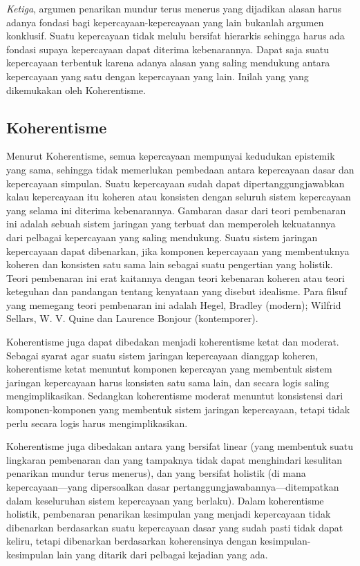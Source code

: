\documentclass[11pt,twoside,a5paper,openany]{memoir}
\begin{document}
\emph{Ketiga}, argumen penarikan mundur terus menerus yang dijadikan
alasan harus adanya fondasi bagi kepercayaan-kepercayaan yang lain
bukanlah argumen konklusif. Suatu kepercayaan tidak melulu bersifat
hierarkis sehingga harus ada fondasi supaya kepercayaan dapat diterima
kebenarannya. Dapat saja suatu kepercayaan terbentuk karena adanya
alasan yang saling mendukung antara kepercayaan yang satu dengan
kepercayaan yang lain. Inilah yang yang dikemukakan oleh Koherentisme.

\hypertarget{koherentisme}{%
\subsection{Koherentisme}\label{koherentisme}}

Menurut Koherentisme, semua kepercayaan mempunyai kedudukan epistemik
yang sama, sehingga tidak memerlukan pembedaan antara kepercayaan dasar
dan kepercayaan simpulan. Suatu kepercayaan sudah dapat
dipertanggungjawabkan kalau kepercayaan itu koheren atau konsisten
dengan seluruh sistem kepercayaan yang selama ini diterima kebenarannya.
Gambaran dasar dari teori pembenaran ini adalah sebuah sistem jaringan
yang terbuat dan memperoleh kekuatannya dari pelbagai kepercayaan yang
saling mendukung. Suatu sistem jaringan kepercayaan dapat dibenarkan,
jika komponen kepercayaan yang membentuknya koheren dan konsisten satu
sama lain sebagai suatu pengertian yang holistik. Teori pembenaran ini
erat kaitannya dengan teori kebenaran koheren atau teori keteguhan dan
pandangan tentang kenyataan yang disebut idealisme. Para filsuf yang
memegang teori pembenaran ini adalah Hegel, Bradley (modern); Wilfrid
Sellars, W. V. Quine dan Laurence Bonjour (kontemporer).

Koherentisme juga dapat dibedakan menjadi koherentisme ketat dan
moderat. Sebagai syarat agar suatu sistem jaringan kepercayaan dianggap
koheren, koherentisme ketat menuntut komponen kepercayan yang membentuk
sistem jaringan kepercayaan harus konsisten satu sama lain, dan secara
logis saling mengimplikasikan. Sedangkan koherentisme moderat menuntut
konsistensi dari komponen-komponen yang membentuk sistem jaringan
kepercayaan, tetapi tidak perlu secara logis harus mengimplikasikan.

Koherentisme juga dibedakan antara yang bersifat linear (yang membentuk
suatu lingkaran pembenaran dan yang tampaknya tidak dapat menghindari
kesulitan penarikan mundur terus menerus), dan yang bersifat holistik
(di mana kepercayaan---yang dipersoalkan dasar
pertanggungjawabannya---ditempatkan dalam keseluruhan sistem kepercayaan
yang berlaku). Dalam koherentisme holistik, pembenaran penarikan
kesimpulan yang menjadi kepercayaan tidak dibenarkan berdasarkan suatu
kepercayaan dasar yang sudah pasti tidak dapat keliru, tetapi dibenarkan
berdasarkan koherensinya dengan kesimpulan-kesimpulan lain yang ditarik
dari pelbagai kejadian yang ada.
\end{document}
